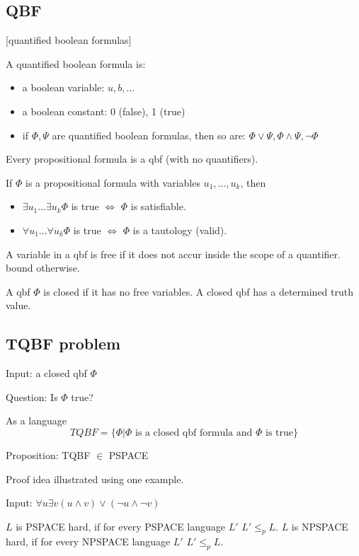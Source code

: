 \documentclass[a4paper,12pt]{article}
\theoremstyle{definition}
\theoremstyle{remark}
\begin{document}
\subsection{QBF}[quantified boolean formulas]

A quantified boolean formula is:
\begin{itemize}
    \item a boolean variable: $u, b, \dots$
    \item a boolean constant: 0 (false), 1 (true)
    \item if $\Phi, \Psi$ are quantified boolean formulas, then so are: $\Phi \lor \Psi, \Phi \land \Psi, \neg \Phi$
\end{itemize}

Every propositional formula is a qbf (with no quantifiers).

If $\Phi$ is a propositional formula with variables $u_1, \dots, u_k$, then 
\begin{itemize}
    \item $\exists u_1 \dots \exists u_k \Phi$ is true $\iff$ $\Phi$ is satisfiable.
    \item $\forall u_1 \dots \forall u_k \Phi$ is true $\iff$ $\Phi$ is a tautology (valid).
\end{itemize}

A variable in a qbf is free if it does not accur inside the scope of a quantifier.
bound otherwise.

A qbf $\Phi$ is closed if it has no free variables.
A closed qbf has a determined truth value.

\subsection{TQBF problem}
Input: a closed qbf $\Phi$

Question: Is $\Phi$ true?

As a language
\begin{equation*}
    TQBF = \{\Phi | \Phi \text{ is a closed qbf formula and } \Phi \text{ is true}\}
\end{equation*}

Proposition: TQBF $\in$ PSPACE

Proof idea illustrated using one example.

Input: $\forall u \exists v (u \land v) \lor (\neg u \land \neg v)$

$L$ is PSPACE hard, if for every PSPACE language $L'$ $L' \leq_p L$.
$L$ is NPSPACE hard, if for every NPSPACE language $L'$ $L' \leq_p L$.
\end{document}
